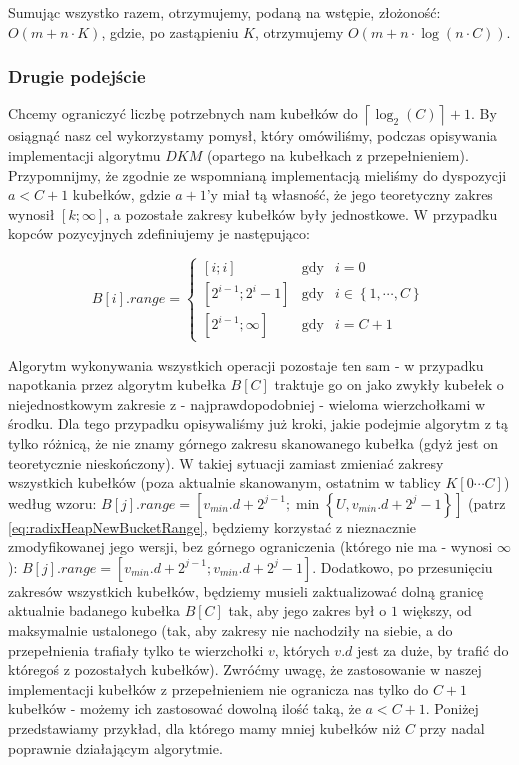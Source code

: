 Sumując wszystko razem, otrzymujemy, podaną na wstępie, złożoność: $ O \left( m + n \cdot K \right)$, gdzie, po zastąpieniu $K$, otrzymujemy $ O \left( m + n \cdot \log \left( n \cdot C \right) \right)$.

\subsubsection{Drugie podejście}

Chcemy ograniczyć liczbę potrzebnych nam kubełków do $ \left \lceil \log_{2} \left( C \right) \right \rceil + 1$. By osiągnąć nasz cel wykorzystamy pomysł, który omówiliśmy, podczas opisywania implementacji algorytmu $DKM$ (opartego na kubełkach z przepełnieniem). Przypomnijmy, że zgodnie ze wspomnianą implementacją mieliśmy do dyspozycji $a < C + 1$ kubełków, gdzie $a + 1$'y miał tą własność, że jego teoretyczny zakres wynosił $\left[ k ; \infty \right]$, a pozostałe zakresy kubełków były jednostkowe. W przypadku kopców pozycyjnych zdefiniujemy je następująco:


\begin{equation}
B \left[ i \right].range = \left\{\begin{matrix}
 \left[ i ; i \right ]& \textrm{gdy} & i = 0 \\ 
 \left[ 2^{i-1} ; 2^{i} - 1 \right ]& \textrm{gdy} & i \in \left\{ 1, \cdots, C \right\} \\
 \left[ 2^{i-1} ; \infty \right ]& \textrm{gdy} & i = C + 1
\end{matrix}\right.
\end{equation}

Algorytm wykonywania wszystkich operacji pozostaje ten sam - w przypadku napotkania przez algorytm kubełka $B \left[ C  \right]$ traktuje go on jako zwykły kubełek o niejednostkowym zakresie z - najprawdopodobniej - wieloma wierzchołkami w środku. Dla tego przypadku opisywaliśmy już kroki, jakie podejmie algorytm z tą tylko różnicą, że nie znamy górnego zakresu skanowanego kubełka (gdyż jest on teoretycznie nieskończony). W takiej sytuacji zamiast zmieniać zakresy wszystkich kubełków (poza aktualnie skanowanym, ostatnim w tablicy $K \left[ 0 \cdots C \right]$) według wzoru: $B \left[ j \right].range = \left[ v_{min}.d + 2 ^{j-1} ; \min \left\{ U, v_{min}.d + 2^{j} - 1 \right\} \right]$ (patrz \ref{eq:radixHeapNewBucketRange}, będziemy korzystać z nieznacznie zmodyfikowanej jego wersji, bez górnego ograniczenia (którego nie ma - wynosi $\infty$):  $B \left[ j \right].range = \left[ v_{min}.d + 2 ^{j-1} ; v_{min}.d + 2^{j} - 1 \right]$. Dodatkowo, po przesunięciu zakresów wszystkich kubełków, będziemy musieli zaktualizować dolną granicę aktualnie badanego kubełka $B \left[ C \right]$ tak, aby jego zakres był o $1$ większy, od maksymalnie ustalonego (tak, aby zakresy nie nachodziły na siebie, a do przepełnienia trafiały tylko te wierzchołki $v$, których $v.d$ jest za duże, by trafić do któregoś z pozostałych kubełków). Zwróćmy uwagę, że zastosowanie w naszej implementacji kubełków z przepełnieniem nie ogranicza nas tylko do $C + 1$ kubełków - możemy ich zastosować dowolną ilość taką, że $a < C + 1$. Poniżej przedstawiamy przykład, dla którego mamy mniej kubełków niż $C$ przy nadal poprawnie działającym algorytmie.

